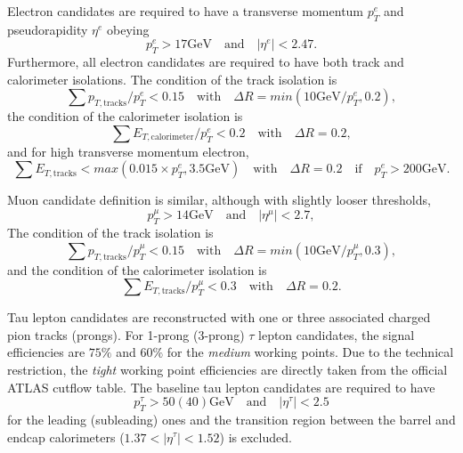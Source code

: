 \documentclass{ws-mpla}
\begin{document}
Electron candidates are required to have a transverse momentum $p^e_T$ and pseudorapidity $\eta^e$ obeying
\begin{equation}
p^e_T > 17 \textrm{GeV}\quad \textrm{and}\quad |\eta^e| < 2.47.
\end{equation}
Furthermore, all electron candidates are required to have both track and calorimeter isolations. The condition of the track isolation is
\begin{equation}
\sum p_{T,\textrm{tracks}}/p^e_T < 0.15\quad \textrm{with}\quad \Delta R=min(10\textrm{GeV}/p^e_T,0.2),
\end{equation}
the condition of the calorimeter isolation is
\begin{equation}
\sum E_{T,\textrm{calorimeter}}/p^e_T < 0.2\quad \textrm{with}\quad \Delta R=0.2,
\end{equation}
and for high transverse momentum electron, 
\begin{equation}
\sum E_{T,\textrm{tracks}} < max(0.015\times p^e_T,3.5\textrm{GeV})\quad \textrm{with}\quad \Delta R=0.2\quad \textrm{if}\quad p^e_T > 200\textrm{GeV}.
\end{equation}

Muon candidate definition is similar, although with slightly looser thresholds,
\begin{equation}
p^{\mu}_T > 14 \textrm{GeV}\quad \textrm{and}\quad |\eta^{\mu}| < 2.7,
\end{equation}
The condition of the track isolation is 
\begin{equation}
\sum p_{T,\textrm{tracks}}/p^{\mu}_T < 0.15\quad \textrm{with}\quad \Delta R=min(10\textrm{GeV}/p^{\mu}_T,0.3),
\end{equation}
and the condition of the calorimeter isolation is
\begin{equation}
\sum E_{T,\textrm{tracks}}/p^{\mu}_T < 0.3\quad \textrm{with}\quad \Delta R=0.2.
\end{equation}

Tau lepton candidates are reconstructed with one or three associated charged pion tracks (prongs). %
For 1-prong (3-prong) $\tau$ lepton candidates, the signal efficiencies are $75\%$ and $60\%$ for the \textit{medium} working points. Due to the technical restriction, the \textit{tight} working point efficiencies are directly taken from the official ATLAS cutflow table. %
The baseline tau lepton candidates are required to have 
\begin{equation}
p^{\tau}_T > 50(40) \textrm{GeV}\quad \textrm{and}\quad |\eta^{\tau}| < 2.5
\end{equation}
for the leading (subleading) ones and the transition region between the barrel and endcap calorimeters ($ 1.37 < |\eta^{\tau}| < 1.52 $) is excluded.
\end{document}
